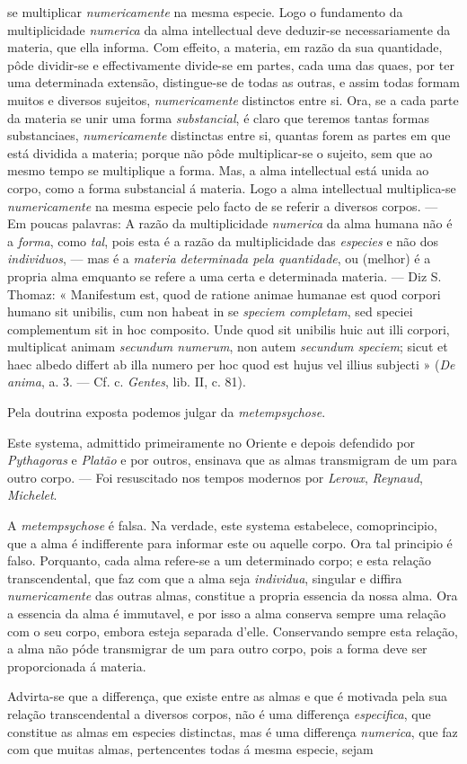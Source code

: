 se multiplicar \emph{numericamente} na mesma especie. Logo o fundamento da multiplicidade \emph{numerica} da alma intellectual deve deduzir-se necessariamente da materia, que ella informa. Com effeito, a materia, em razão da sua quantidade, pôde dividir-se e effectivamente divide-se em partes, cada uma das quaes, por ter uma determinada extensão, distingue-se de todas as outras, e assim todas formam muitos e diversos sujeitos, \emph{numericamente} distinctos entre si. Ora, se a cada parte da materia se unir uma forma \emph{substancial}, é claro que teremos tantas formas substanciaes, \emph{numericamente} distinctas entre si, quantas forem as partes em que está dividida a materia; porque não pôde multiplicar-se o sujeito, sem que ao mesmo tempo se multiplique a forma. Mas, a alma intellectual está unida ao corpo, como a forma substancial á materia. Logo a alma intellectual multiplica-se \emph{numericamente} na mesma especie pelo facto de se referir a diversos corpos. --- Em poucas palavras: A razão da multiplicidade \emph{numerica} da alma humana não é a \emph{forma}, como \emph{tal}, pois esta é a razão da multiplicidade das \emph{especies} e não dos \emph{individuos}, --- mas é a \emph{materia determinada pela quantidade}, ou (melhor) é a propria alma emquanto se refere a uma certa e determinada materia. --- Diz S. Thomaz: « Manifestum est, quod de ratione animae humanae est quod corpori humano sit unibilis, cum non habeat in se \emph{speciem completam}, sed speciei complementum sit in hoc composito. Unde quod sit unibilis huic aut illi corpori, multiplicat animam \emph{secundum numerum}, non autem \emph{secundum speciem}; sicut et haec albedo differt ab illa numero per hoc quod est hujus vel illius subjecti » (\emph{De anima}, a. 3. --- Cf. c. \emph{Gentes}, lib. II, c. 81).\par Pela doutrina exposta podemos julgar da \emph{metempsychose}.\par Este systema, admittido primeiramente no Oriente e depois defendido por \emph{Pythagoras} e \emph{Platão} e por outros, ensinava que as almas transmigram de um para outro corpo. --- Foi resuscitado nos tempos modernos por \emph{Leroux}, \emph{Reynaud}, \emph{Michelet}.\par A \emph{metempsychose} é falsa. Na verdade, este systema estabelece, comoprincipio, que a alma é indifferente para informar este ou aquelle corpo. Ora tal principio é falso. Porquanto, cada alma refere-se a um determinado corpo; e esta relação transcendental, que faz com que a alma seja \emph{individua}, singular e diffira \emph{numericamente} das outras almas, constitue a propria essencia da nossa alma. Ora a essencia da alma é immutavel, e por isso a alma conserva sempre uma relação com o seu corpo, embora esteja separada d'elle. Conservando sempre esta relação, a alma não póde transmigrar de um para outro corpo, pois a forma deve ser proporcionada á materia.\par Advirta-se que a differença, que existe entre as almas e que é motivada pela sua relação transcendental a diversos corpos, não é uma differença \emph{especifica}, que constitue as almas em especies distinctas, mas é uma differença \emph{numerica}, que faz com que muitas almas, pertencentes todas á mesma especie, sejam 